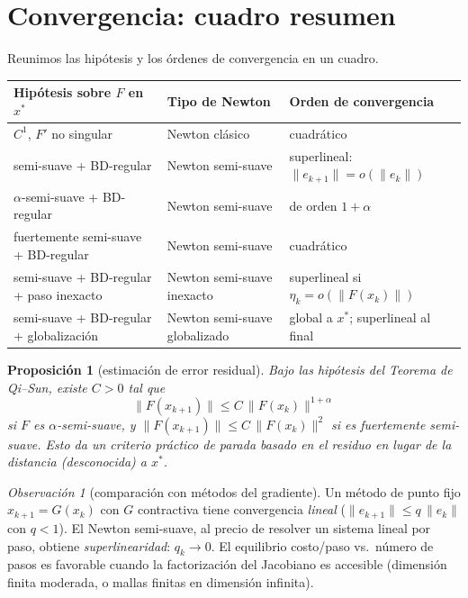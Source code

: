 \documentclass[12pt]{book}
\theoremstyle{definition}
\theoremstyle{plain}
\newtheorem{proposicion}{Proposición}[section]
\theoremstyle{remark}
\newtheorem{observacion}{Observación}[section]
\begin{document}
\section{Convergencia: cuadro resumen}\label{sec:convergencia}

Reunimos las hipótesis y los órdenes de convergencia en un cuadro.
\medskip

\begin{center}
\renewcommand{\arraystretch}{1.3}
\begin{tabular}{@{}l|l|l@{}}
\hline
\textbf{Hipótesis sobre $F$ en $x^*$}
  & \textbf{Tipo de Newton}
  & \textbf{Orden de convergencia}\\
\hline
$C^1$, $F'$ no singular
  & Newton clásico
  & cuadrático \\
semi-suave + BD-regular
  & Newton semi-suave
  & superlineal: $\|e_{k+1}\|=o(\|e_k\|)$ \\
$\alpha$-semi-suave + BD-regular
  & Newton semi-suave
  & de orden $1+\alpha$ \\
fuertemente semi-suave + BD-regular
  & Newton semi-suave
  & cuadrático \\
semi-suave + BD-regular + paso inexacto
  & Newton semi-suave inexacto
  & superlineal si $\eta_k=o(\|F(x_k)\|)$ \\
semi-suave + BD-regular + globalización
  & Newton semi-suave globalizado
  & global a $x^*$; superlineal al final \\
\hline
\end{tabular}
\end{center}

\smallskip

\begin{proposicion}[estimación de error residual]
  Bajo las hipótesis del Teorema de Qi--Sun, existe $C>0$ tal que
  \[
    \|F(x_{k+1})\| \le C\,\|F(x_k)\|^{1+\alpha}
  \]
  si $F$ es $\alpha$-semi-suave, y
  $\|F(x_{k+1})\|\le C\,\|F(x_k)\|^2$ si es fuertemente
  semi-suave.  Esto da un criterio práctico de parada basado en el
  \emph{residuo} en lugar de la distancia (desconocida) a $x^*$.
\end{proposicion}

\begin{observacion}[comparación con métodos del gradiente]
  Un método de punto fijo $x_{k+1}=G(x_k)$ con $G$ contractiva
  tiene convergencia \emph{lineal} ($\|e_{k+1}\|\le q\,\|e_k\|$
  con $q<1$).  El Newton semi-suave, al precio de resolver un
  sistema lineal por paso, obtiene \emph{superlinearidad}:
  $q_k\to0$.  El equilibrio costo/paso vs.\ número de pasos es
  favorable cuando la factorización del Jacobiano es accesible
  (dimensión finita moderada, o mallas finitas en dimensión
  infinita).
\end{observacion}
\end{document}
